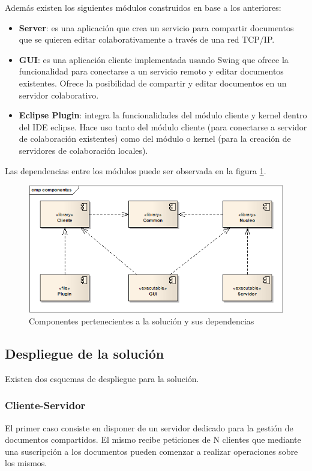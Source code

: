 \documentclass[12pt,a4paper]{article}
\begin{document}
Además existen los siguientes módulos construidos en base a los anteriores:
\begin{itemize}
	\item \textbf{Server}: es una aplicación que crea un servicio para compartir documentos que se quieren
	editar colaborativamente a través de una red TCP/IP.
	\item \textbf{GUI}: es una aplicación cliente implementada usando Swing que ofrece la funcionalidad
	para conectarse a un servicio remoto y editar documentos existentes. Ofrece la posibilidad de compartir
	y editar documentos	en un servidor colaborativo.
	\item \textbf{Eclipse Plugin}: integra la funcionalidades del módulo cliente y kernel dentro del IDE eclipse.
	Hace uso tanto del módulo cliente (para conectarse a servidor de colaboración existentes) como del módulo
	o kernel (para la creación de servidores de colaboración locales).
\end{itemize}

Las dependencias entre los módulos puede ser observada en la figura \ref{componentes}.

	\begin{figure}[!ht]
		\begin{center}
			\includegraphics[width=13cm]{componentes.png}
			\caption{\label{componentes} Componentes pertenecientes a la solución y sus dependencias }
		\end{center}
	\end{figure}

\subsection{Despliegue de la solución}
Existen dos esquemas de despliegue para la solución.

\subsubsection{Cliente-Servidor}
El primer caso consiste en disponer de un servidor dedicado para la gestión de documentos compartidos. El mismo recibe
peticiones de N clientes que mediante una suscripción a los documentos pueden comenzar a realizar operaciones sobre los mismos.
\end{document}

